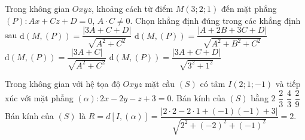 \begin{ex}%
	Trong không gian $Oxyz$, khoảng cách từ điểm $M(3;2;1)$ đến mặt phẳng $(P)\colon Ax+Cz+D=0$, $A\cdot C\ne 0$. Chọn khẳng định đúng trong các khẳng định sau
	\choice
	{\True $\mathrm{d}(M,(P))=\dfrac{|3A+C+D|}{\sqrt{A^2+C^2}}$}
	{$\mathrm{d}(M,(P))=\dfrac{|A+2B+3C+D|}{\sqrt{A^2+B^2+C^2}}$}
	{$\mathrm{d}(M,(P))=\dfrac{|3A+C|}{\sqrt{A^2+C^2}}$}
	{$\mathrm{d}(M,(P))=\dfrac{|3A+C+D|}{\sqrt{3^2+1^2}}$}
\end{ex}
\begin{ex}%
	Trong không gian với hệ tọa độ $Oxyz$ mặt cầu $(S)$ có tâm $I(2;1;-1)$ và tiếp xúc với mặt phẳng $(\alpha)\colon 2x-2y-z+3=0$. Bán kính của $(S)$ bằng
	\choice
	{\True $2$}
	{$\dfrac{2}{3}$}
	{$\dfrac{4}{3}$}
	{$\dfrac{2}{9}$}
	\loigiai
	{Bán kính của $(S)$ là $R=d[I,(\alpha)]=\dfrac{|2\cdot 2-2\cdot 1+(-1 )(-1 )+3|}{\sqrt{2^2+(-2)^2+(-1 )^2}}=2$.
	}
\end{ex}

